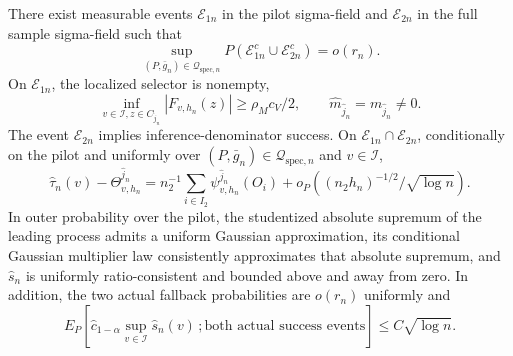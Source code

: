 There exist measurable events \(\mathcal E_{1n}\) in the pilot sigma-field and \(\mathcal E_{2n}\) in the full sample sigma-field such that
\[
 \sup_{(P,\bar g_n)\in\mathcal Q_{\mathrm{spec},n}}
 P(\mathcal E_{1n}^c\cup\mathcal E_{2n}^c)=o(r_n).
\]
On \(\mathcal E_{1n}\), the localized selector is nonempty,
\[
 \inf_{v\in\mathcal I,z\in C_{\widehat j_n}}|F_{v,h_n}(z)|
 \ge\rho_Mc_V/2,
 \qquad
 \widehat m_{\widehat j_n}=m_{\widehat j_n}\ne0.
\]
The event \(\mathcal E_{2n}\) implies inference-denominator success.  On \(\mathcal E_{1n}\cap\mathcal E_{2n}\), conditionally on the pilot and uniformly over \((P,\bar g_n)\in\mathcal Q_{\mathrm{spec},n}\) and \(v\in\mathcal I\),
\[
 \widehat\tau_n(v)-\Theta^{\widehat j_n}_{v,h_n}
 =n_2^{-1}\sum_{i\in I_2}\psi^{\widehat j_n}_{v,h_n}(O_i)
 +o_P\!\left((n_2h_n)^{-1/2}/\sqrt{\log n}\right).
\]
In outer probability over the pilot, the studentized absolute supremum of the leading process admits a uniform Gaussian approximation, its conditional Gaussian multiplier law consistently approximates that absolute supremum, and \(\widehat s_n\) is uniformly ratio-consistent and bounded above and away from zero.  In addition, the two actual fallback probabilities are \(o(r_n)\) uniformly and
\[
 E_P\!\left[\widehat c_{1-\alpha}\sup_{v\in\mathcal I}\widehat s_n(v)\,; \text{both actual success events}\right]\le C\sqrt{\log n}.
\]